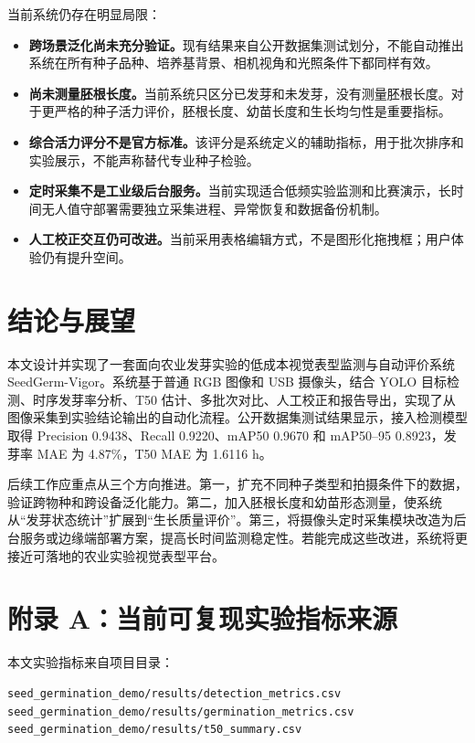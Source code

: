 \documentclass[UTF8,a4paper,zihao=-4]{ctexart}
\begin{document}
当前系统仍存在明显局限：
\begin{itemize}
  \item \textbf{跨场景泛化尚未充分验证。}现有结果来自公开数据集测试划分，不能自动推出系统在所有种子品种、培养基背景、相机视角和光照条件下都同样有效。
  \item \textbf{尚未测量胚根长度。}当前系统只区分已发芽和未发芽，没有测量胚根长度。对于更严格的种子活力评价，胚根长度、幼苗长度和生长均匀性是重要指标。
  \item \textbf{综合活力评分不是官方标准。}该评分是系统定义的辅助指标，用于批次排序和实验展示，不能声称替代专业种子检验。
  \item \textbf{定时采集不是工业级后台服务。}当前实现适合低频实验监测和比赛演示，长时间无人值守部署需要独立采集进程、异常恢复和数据备份机制。
  \item \textbf{人工校正交互仍可改进。}当前采用表格编辑方式，不是图形化拖拽框；用户体验仍有提升空间。
\end{itemize}

\section{结论与展望}

本文设计并实现了一套面向农业发芽实验的低成本视觉表型监测与自动评价系统 SeedGerm-Vigor。系统基于普通 RGB 图像和 USB 摄像头，结合 YOLO 目标检测、时序发芽率分析、T50 估计、多批次对比、人工校正和报告导出，实现了从图像采集到实验结论输出的自动化流程。公开数据集测试结果显示，接入检测模型取得 Precision 0.9438、Recall 0.9220、mAP50 0.9670 和 mAP50--95 0.8923，发芽率 MAE 为 4.87\%，T50 MAE 为 1.6116 h。

后续工作应重点从三个方向推进。第一，扩充不同种子类型和拍摄条件下的数据，验证跨物种和跨设备泛化能力。第二，加入胚根长度和幼苗形态测量，使系统从“发芽状态统计”扩展到“生长质量评价”。第三，将摄像头定时采集模块改造为后台服务或边缘端部署方案，提高长时间监测稳定性。若能完成这些改进，系统将更接近可落地的农业实验视觉表型平台。

\section*{附录 A：当前可复现实验指标来源}

本文实验指标来自项目目录：
\begin{lstlisting}
seed_germination_demo/results/detection_metrics.csv
seed_germination_demo/results/germination_metrics.csv
seed_germination_demo/results/t50_summary.csv
\end{lstlisting}
\end{document}
